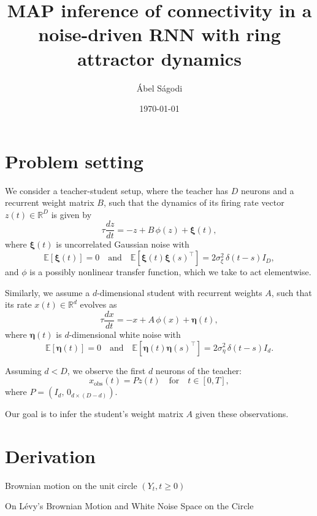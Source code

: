 \documentclass{article}
\title{MAP inference of connectivity in a noise-driven RNN with ring attractor dynamics}
\author{\'Abel S\'agodi}
\date{\today}
\theoremstyle{definition} \newtheorem{definition}{Definition}
\theoremstyle{remark} \newtheorem{remark}{Remark}
\newcounter{ct}
\begin{document}
\maketitle

\section{Problem setting}
We consider a teacher-student setup, where the teacher has \( D \) neurons and a recurrent weight matrix \( B \), such that the dynamics of its firing rate vector \( z(t) \in \mathbb{R}^D \) is given by
\[
\tau \frac{d z}{dt} = -z + B \, \phi(z) + \boldsymbol{\xi}(t),
\]
where \( \boldsymbol{\xi}(t) \) is uncorrelated Gaussian noise with 
\[
\mathbb{E}[\boldsymbol{\xi}(t)] = 0 \quad \text{and} \quad \mathbb{E}[\boldsymbol{\xi}(t) \boldsymbol{\xi}(s)^\top] = 2 \sigma^2_{\xi} \, \delta(t - s) I_D,
\]
and \( \phi \) is a possibly nonlinear transfer function, which we take to act elementwise.



Similarly, we assume a \( d \)-dimensional student with recurrent weights \( A \), such that its rate \( x(t) \in \mathbb{R}^d \) evolves as
\[
\tau \frac{d x}{dt} = -x + A \, \phi(x) + \boldsymbol{\eta}(t),
\]
where \( \boldsymbol{\eta}(t) \) is \( d \)-dimensional white noise with
\[
\mathbb{E}[\boldsymbol{\eta}(t)] = 0 \quad \text{and} \quad \mathbb{E}[\boldsymbol{\eta}(t) \boldsymbol{\eta}(s)^\top] = 2 \sigma^2_{\eta} \, \delta(t - s) I_d.
\]

Assuming \( d < D \), we observe the first \( d \) neurons of the teacher:
\[
x_{\text{obs}}(t) = P z(t) \quad \text{for} \quad t \in [0, T],
\]
where \( P = (I_d, \, 0_{d \times (D - d)}) \).

Our goal is to infer the student’s weight matrix \( A \) given these observations.


\section{Derivation}

Brownian motion on the unit circle \((Y_t , t \geq 0)\) \citep{liu2012stochastic}

On L\'evy’s Brownian Motion and White Noise Space on the Circle \citep{huang2021levy}


\newpage


\end{document}
